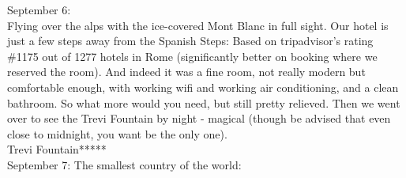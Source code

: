 September 6:\\
Flying over the alps with the ice-covered Mont Blanc in full sight. Our hotel is just a few steps away from the Spanish Steps: Based on tripadvisor's rating \#1175 out of 1277 hotels in Rome (significantly better on booking where we reserved the room). And indeed it was a fine room, not really modern but comfortable enough, with working wifi and working air conditioning, and a clean bathroom. So what more would you need, but still pretty relieved. Then we went over to see the Trevi Fountain by night - magical (though be advised that even close to midnight, you want be the only one).\\

Trevi Fountain*****\\

September 7: The smallest country of the world:\\
